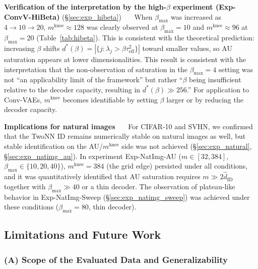 \documentclass[make,article,submit,pdftex,moreauthors]{Definitions/mdpi}
\newcommand{\mknee}{m^{\mathrm{knee}}}
\begin{document}
\textbf{Verification of the interpretation by the high-$\beta$ experiment (Exp-ConvV-HiBeta)} (\S\ref{sec:exp_hibeta})~~~
When $\beta_{\max}$ was increased as $4\to10\to20$, $\mknee \approx 128$ was clearly
observed at $\beta_{\max}=10$ and $\mknee \approx 96$ at $\beta_{\max}=20$
(Table~\ref{tab:hibeta}).
This is consistent with the theoretical prediction: increasing $\beta$ shifts
$d^*(\beta) = |\{j: \lambda_j > \beta\tau^2_\mathrm{eff}\}|$ toward smaller values, so
AU saturation appears at lower dimensionalities.
This result is consistent with the interpretation that the non-observation of
saturation in the $\beta_{\max}=4$ setting was not ``an applicability limit of the
framework'' but rather ``$\beta$ being insufficient relative to the decoder capacity,
resulting in $d^*(\beta) \gg 256$.''
For application to Conv-VAEs, $\mknee$ becomes identifiable by setting $\beta$ larger
or by reducing the decoder capacity.


\textbf{Implications for natural images}~~~
For CIFAR-10 and SVHN, we confirmed that the TwoNN ID remains numerically stable on
natural images as well, but stable identification on the AU/$\mknee$ side was not
achieved (\S\ref{sec:exp_natural}, \S\ref{sec:exp_natimg_au}).
In experiment Exp-NatImg-AU ($m \in [32, 384]$, $\beta_{\max} \in \{10,20,40\}$),
$\mknee = 384$ (the grid edge) persisted under all conditions, and it was quantitatively
identified that AU saturation requires $m \gg 2\hat{d}_\mathrm{ID}$ together with
$\beta_{\max} \gg 40$ or a thin decoder.
The observation of plateau-like behavior in Exp-NatImg-Sweep
(\S\ref{sec:exp_natimg_sweep}) was achieved under these conditions
($\beta_{\max}=80$, thin decoder).

\subsection{Limitations and Future Work}\label{sec:disc_limitation}

\subsubsection*{(A) Scope of the Evaluated Data and Generalizability}
\end{document}
